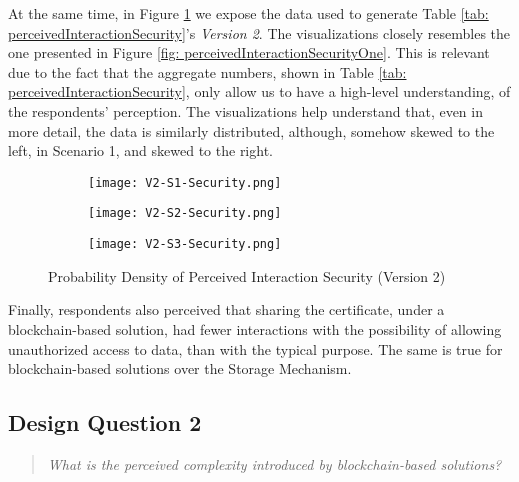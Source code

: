 At the same time, in Figure \ref{fig: perceivedInteractionSecurityTwo} we expose the data used to generate Table \ref{tab: perceivedInteractionSecurity}'s \textit{Version 2}. The visualizations closely resembles the one presented in Figure \ref{fig: perceivedInteractionSecurityOne}. This is relevant due to the fact that the aggregate numbers, shown in Table \ref{tab: perceivedInteractionSecurity}, only allow us to have a high-level understanding, of the respondents' perception. The visualizations help understand that, even in more detail, the data is similarly distributed, although, somehow skewed to the left, in Scenario 1, and skewed to the right.

\begin{figure}[htb]
	\centering
	\begin{subfigure}[b]{0.49\textwidth}
		\centering
		\texttt{[image: V2-S1-Security.png]}
	\end{subfigure}
	\begin{subfigure}[b]{0.49\textwidth}
		\centering
		\texttt{[image: V2-S2-Security.png]}
	\end{subfigure}
	\hfill
	\begin{subfigure}[b]{0.49\textwidth}
		\centering
		\texttt{[image: V2-S3-Security.png]}
	\end{subfigure}

	\caption{Probability Density of Perceived Interaction Security (Version 2)}
	\label{fig: perceivedInteractionSecurityTwo}
\end{figure}

Finally, respondents also perceived that sharing the certificate, under a blockchain-based solution, had fewer interactions with the possibility of allowing unauthorized access to data, than with the typical purpose. The same is true for blockchain-based solutions over the Storage Mechanism.

\subsection{Design Question 2}

\begin{quote}
	\textit{What is the perceived complexity introduced by blockchain-based solutions?}
\end{quote}

